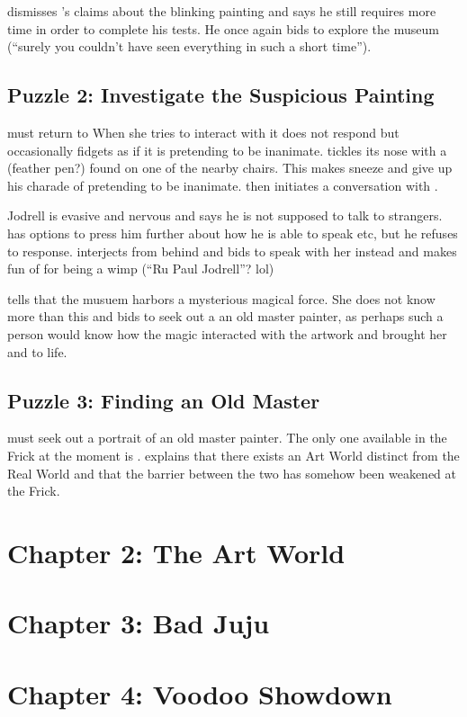 \documentclass{article}
\begin{document}
\ccurator{} dismisses \cyl{}'s claims about the blinking painting and says he still requires more time in order to complete his tests. He once again bids \cyl{} to explore the museum (``surely you couldn't have seen everything in such a short time'').

\subsection{Puzzle 2: Investigate the Suspicious Painting}
\cyl{} must return to \prpjodrell{} When she tries to interact with it does not respond but occasionally fidgets as if it is pretending to be inanimate. \cyl{} tickles its nose with a \ifeather{} (feather pen?) found on one of the nearby chairs. This makes \prpjodrell{} sneeze and give up his charade of pretending to be inanimate. \prpjodrell{} then initiates a conversation with \cyl{}. 

Jodrell is evasive and nervous and says he is not supposed to talk to strangers. \cyl{} has options to press him further about how he is able to speak etc, but he refuses to response. \pdally interjects from behind and bids \cyl{} to speak with her instead and makes fun of \prpjodrell{} for being a wimp (``Ru Paul Jodrell''? lol)

\pdally tells \cyl{} that the musuem harbors a mysterious magical force. She does not know more than this and bids \cyl{} to seek out a an old master painter, as perhaps such a person would know how the magic interacted with the artwork and brought her and \prpjodrell{} to life.

\subsection{Puzzle 3: Finding an Old Master}
\cyl{} must seek out a portrait of an old master painter. The only one available in the Frick at the moment is \prembrandt{}. \prembrandt{} explains that there exists an Art World distinct from the Real World and that the barrier between the two has somehow been weakened at the Frick.

\section{Chapter 2: The Art World}
\section{Chapter 3: Bad Juju}
\section{Chapter 4: Voodoo Showdown}
\end{document}
